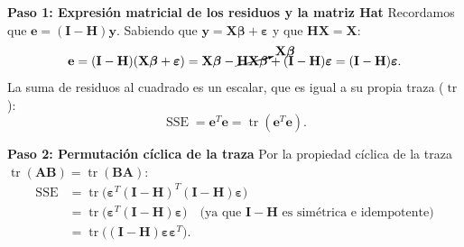 \documentclass[11pt,a4paper]{article}
\begin{document}
\begin{demobox}[{Demostración de $\mathbb{E}[\operatorname{SSE}] = (n-k-1)\sigma^2$ \\ mediante operador traza}]
\textbf{Paso 1: Expresión matricial de los residuos y la matriz Hat}  
Recordamos que $\mathbf{e} = (\mathbf{I} - \mathbf{H})\mathbf{y}$. Sabiendo que $\mathbf{y} = \mathbf{X}\boldsymbol{\beta} + \boldsymbol{\varepsilon}$ y que $\mathbf{H}\mathbf{X} = \mathbf{X}$:
\begin{equation}
\mathbf{e} = (\mathbf{I} - \mathbf{H})(\mathbf{X}\boldsymbol{\beta} + \boldsymbol{\varepsilon}) = \mathbf{X}\boldsymbol{\beta} - \cancelto{\mathbf{X}\boldsymbol{\beta}}{\mathbf{H}\mathbf{X}\boldsymbol{\beta}} + (\mathbf{I} - \mathbf{H})\boldsymbol{\varepsilon} = (\mathbf{I} - \mathbf{H})\boldsymbol{\varepsilon}.
\end{equation}
La suma de residuos al cuadrado es un escalar, que es igual a su propia traza ($\operatorname{tr}$):
\begin{equation}
\operatorname{SSE} = \mathbf{e}^T \mathbf{e} = \operatorname{tr}(\mathbf{e}^T \mathbf{e}).
\end{equation}

\textbf{Paso 2: Permutación cíclica de la traza}  
Por la propiedad cíclica de la traza $\operatorname{tr}(\mathbf{A}\mathbf{B}) = \operatorname{tr}(\mathbf{B}\mathbf{A})$:
\begin{align}
\operatorname{SSE} &= \operatorname{tr}\big( \boldsymbol{\varepsilon}^T (\mathbf{I} - \mathbf{H})^T (\mathbf{I} - \mathbf{H}) \boldsymbol{\varepsilon} \big) \\
&= \operatorname{tr}\big( \boldsymbol{\varepsilon}^T (\mathbf{I} - \mathbf{H}) \boldsymbol{\varepsilon} \big) \quad \text{(ya que $\mathbf{I}-\mathbf{H}$ es simétrica e idempotente)} \\
&= \operatorname{tr}\big( (\mathbf{I} - \mathbf{H}) \boldsymbol{\varepsilon} \boldsymbol{\varepsilon}^T \big).
\end{align}


\end{demobox}
\end{document}
